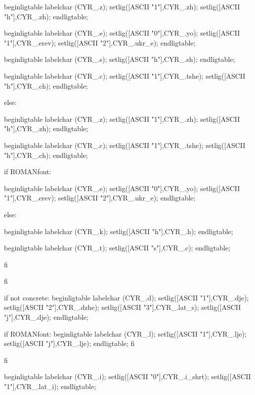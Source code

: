 {    beginligtable^^M%
      labelchar (CYR_.z);
        setlig([ASCII "1"],CYR_.zh); setlig([ASCII "h"],CYR_.zh);
    endligtable;

    beginligtable^^M%
      labelchar (CYR_.e);
        setlig([ASCII "0"],CYR_.yo); setlig([ASCII "1"],CYR_.erev);
        setlig([ASCII "2"],CYR_.ukr_e);
    endligtable;

    beginligtable^^M%
      labelchar (CYR_.s);
        setlig([ASCII "h"],CYR_.sh);
    endligtable;

    beginligtable^^M%
      labelchar (CYR_.c);
        setlig([ASCII "1"],CYR_.tshe); setlig([ASCII "h"],CYR_.ch);
    endligtable;

%
  else:^^M%

    beginligtable^^M%
      labelchar (CYR_.z);
        setlig([ASCII "1"],CYR_.zh); setlig([ASCII "h"],CYR_.zh);
    endligtable;

    beginligtable^^M%
      labelchar (CYR_.c);
        setlig([ASCII "1"],CYR_.tshe); setlig([ASCII "h"],CYR_.ch);
    endligtable;

%
    if  ROMANfont:^^M%

      beginligtable^^M%
        labelchar (CYR_.e);
          setlig([ASCII "0"],CYR_.yo); setlig([ASCII "1"],CYR_.erev);
          setlig([ASCII "2"],CYR_.ukr_e);
      endligtable;

%
    else:^^M%

      beginligtable ^^M%
        labelchar (CYR_.k); setlig([ASCII "h"],CYR_.h);
      endligtable;

      beginligtable^^M%
        labelchar (CYR_.t); setlig([ASCII "s"],CYR_.c);
      endligtable;

    fi^^M%

  fi^^M%

  if not concrete:^^M%
    beginligtable^^M%
      labelchar (CYR_.d);
        setlig([ASCII "1"],CYR_.dje); setlig([ASCII "2"],CYR_.dzhe);
        setlig([ASCII "3"],CYR_.lat_s); setlig([ASCII "j"],CYR_.dje);
    endligtable;

    if ROMANfont:^^M%
       beginligtable^^M%
         labelchar (CYR_.l);
           setlig([ASCII "1"],CYR_.lje); setlig([ASCII "j"],CYR_.lje);
       endligtable;
    fi^^M%

  fi^^M%


  beginligtable
    labelchar (CYR_.i);
      setlig([ASCII "0"],CYR_.i_shrt); setlig([ASCII "1"],CYR_.lat_i);
  endligtable;

}
